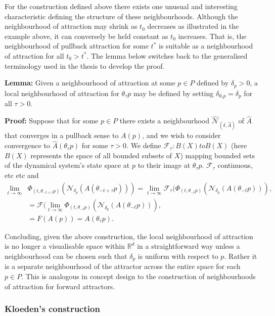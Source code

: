 \documentclass{article}
\begin{document}
For the construction defined above there exists one unusual and interesting
characteristic defining the structure of these neighbourhoods. Although the
neighbourhood of attraction may shrink as $t_0$ decreases as illustrated in the
example above, it can conversely be held constant as $t_0$ increases. That is,
the neighbourhood of pullback attraction for some $t^*$ is suitable as a
neighbourhood of attraction for all $t_0> t^*$. The lemma below switches back to
the generalised terminology used in the thesis to develop the proof.

\textbf{Lemma:} Given a neighbourhood of attraction at some $p \in P$ defined by
$\delta_p > 0$, a local neighbourhood of attraction for $\theta_{\tau} p$  may
be defined by setting $\delta_{\theta_{\tau} p} =  \delta_{p}$ for all $\tau >
0$.

\textbf{Proof:} Suppose that for some $p \in P$  there exists a neighbourhood
$\hat{\mathcal{N}}_{(\delta, \hat{A})}$ of $\hat{A}$ that
converges in a pullback sense to $A(p)$, and we wish to consider convergence to
$\hat{A}(\theta_{\tau}p)$ for some $\tau>0$. We define
$\mathcal{F}_{\tau} : B(X) to B(X)$ (here $B(X)$ represents the space of all
bounded subsets of $X$) mapping bounded sets of the dynamical system's state
space at $p$ to their image at $\theta_{\tau}p$. $\mathcal{F}_{\tau}$
continuous, etc etc and
\begin{align*}
  \lim_{t \to \infty} & \Phi_{(t, \theta_{-t+\tau}p)}
              (\mathcal{N}_{\delta_p} (A(\theta_{-t + \tau}p)))
              = \lim_{t \to \infty}  \mathcal{F}_{\tau} ( \Phi_{(t,
              \theta_{-t}p)} (\mathcal{N}_{\delta_p}(A(\theta_{-t}p))) , \\
  &=  \mathcal{F}( \lim_{t \to \infty} \Phi_{(t, \theta_{-t}p)}
              (\mathcal{N}_{\delta_p}(A(\theta_{-t}p))) , \\
  &= F(A(p)) = A(\theta_{\tau}p).
\end{align*}

Concluding, given the above construction, the local neighbourhood of attraction
is no longer a visualisable space within $\mathbb{R}^d$ in a straightforward way
unless a neighbourhood can be chosen such that $\delta_p$ is
uniform with respect to $p$. Rather it is a separate neighbourhood of the
attractor across the entire space for each $p \in P$. This is analogous in
concept design to the construction of neighbourhoods of attraction for forward
attractors.

\subsubsection{Kloeden's construction}
\end{document}

